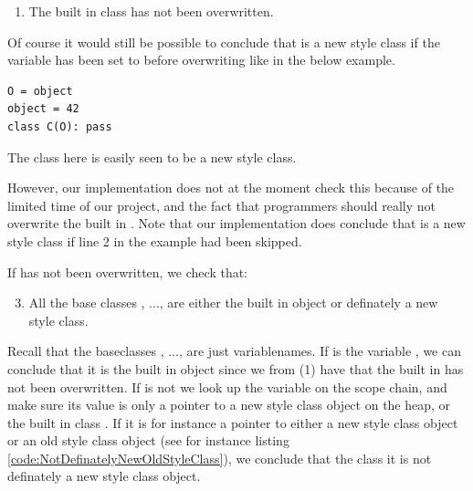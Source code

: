 \begin{enumerate}
	\item The built in class  has not been overwritten.
\end{enumerate}

Of course it would still be possible to conclude that  is a new style class if the variable  has been set to  before overwriting  like in the below example.

\begin{listing}[H]
	\begin{verbatim}
O = object
object = 42
class C(O): pass
	\end{verbatim}
	\caption{The class  here is easily seen to be a new style class.}\label{code:ClassOverwrittenObject}
\end{listing}

However, our implementation does not at the moment check this because of the limited time of our project, and the fact that programmers should really not overwrite the built in . Note that our implementation does conclude that  is a new style class if line 2 in the example had been skipped.

If  has not been overwritten, we check that:

\begin{enumerate}
\setcounter{enumi}{2}
	\item All the base classes , ...,  are either the built in object or definately a new style class.
\end{enumerate}

Recall that the baseclasses , ...,  are just variablenames. If  is the variable , we can conclude that it is the built in object since we from (1) have that the built in  has not been overwritten. If  is not  we look up the variable on the scope chain, and make sure its value is only a pointer to a new style class object on the heap, or the built in class . If it is for instance a pointer to either a new style class object or an old style class object (see for instance listing \ref{code:NotDefinatelyNewOldStyleClass}), we conclude that the class  it is not definately a new style class object.

